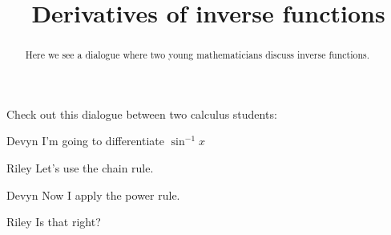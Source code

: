 \documentclass{ximera}
\title[Break-Ground:]{Derivatives of inverse functions}
\begin{document}
\begin{abstract}
Here we see a dialogue where two young mathematicians discuss inverse functions.
\end{abstract}
\maketitle

Check out this dialogue between two calculus students:

\begin{dialogue}
\item[Devyn] I'm going to differentiate $\sin^{-1} x$
\item[Riley] Let's use the chain rule.
\item[Devyn] Now I apply the power rule.
\item[Riley] Is that right?
\end{dialogue}



\end{document}
